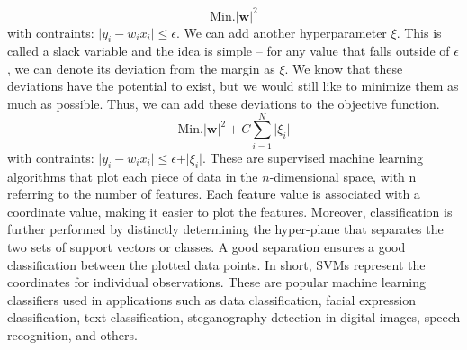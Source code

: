 \documentclass[11pt]{article}
\begin{document}
\begin{itemize}
\begin{equation}
\text{Min.} \vert \textbf{w} \vert^{2} 
\end{equation}
with contraints: $\vert y_{i} - w_{i} x_{i}\vert  \le \epsilon $. 
We can add another hyperparameter $\xi$. This is called a slack variable and the idea is simple -- for any value that falls outside of $\epsilon$, we can denote its deviation from the margin as $\xi$. 
We know that these deviations have the potential to exist, but we would still like to minimize them as much as possible. Thus, we can add these deviations to the objective function.
\begin{equation}
\text{Min.} \vert \textbf{w} \vert^{2}  + C \sum_{i=1}^{N} \vert \xi_i \vert
\end{equation}
with contraints: $\vert y_{i} - w_{i} x_{i} \vert  \le \epsilon + \vert \xi_i \vert $.
These are supervised machine learning algorithms that plot each piece of data in the $n$-dimensional space, with n referring to the number of features. Each feature value is associated with a coordinate value, making it easier to plot the features. Moreover, classification is further performed by distinctly determining the hyper-plane that separates the two sets of support vectors or classes. A good separation ensures a good classification between the plotted data points. In short, SVMs represent the coordinates for individual observations. These are popular machine learning classifiers used in applications such as data classification, facial expression classification, text classification, steganography detection in digital images, speech recognition, and others.



\end{itemize}
\end{document}
